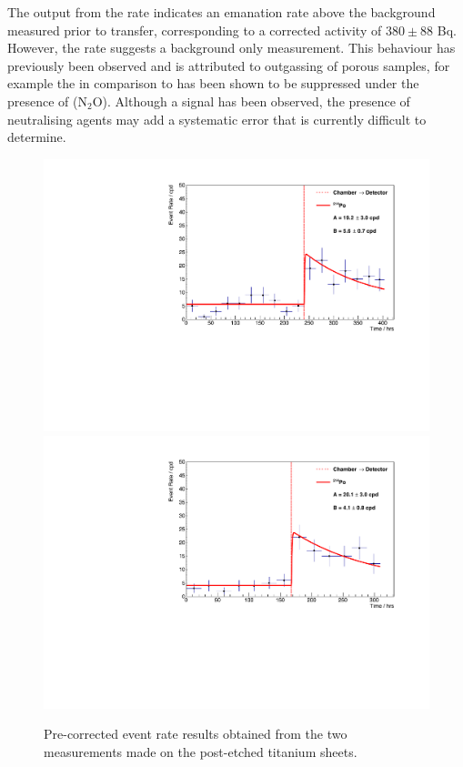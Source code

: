 The output from the \PoTOF{} rate indicates an emanation rate above the background measured prior to transfer, corresponding to a corrected activity of $380\pm88$ \micro{}Bq. However, the \PoTOE{} rate suggests a background only measurement. This behaviour has previously been observed and is attributed to outgassing of porous samples, for example the \PoTOE{} in comparison to \PoTOF{} has been shown to be suppressed under the presence of (N$_{2}$O). Although a signal has been observed, the presence of neutralising agents may add a systematic error that is currently difficult to determine. 
%
\begin{figure}[t!]
    \centering
    \includegraphics[scale=0.42]{Chapter_4/Figures/ucl_measurements/titanium_sheets_post_etching_1_Po214.pdf}
    \includegraphics[scale=0.42]{Chapter_4/Figures/ucl_measurements/titanium_sheets_post_etching_2_Po214.pdf}    
    \caption[Pre-corrected \PoTOF{} and \PoTOE{} event rate results obtained from the single measurement made on the pre-etched titanium sheets.]
    {Pre-corrected \PoTOF{} event rate results obtained from the two measurements made on the post-etched titanium sheets.}
    \label{fig:ti_post_etched_sheets_results}
\end{figure}
%


